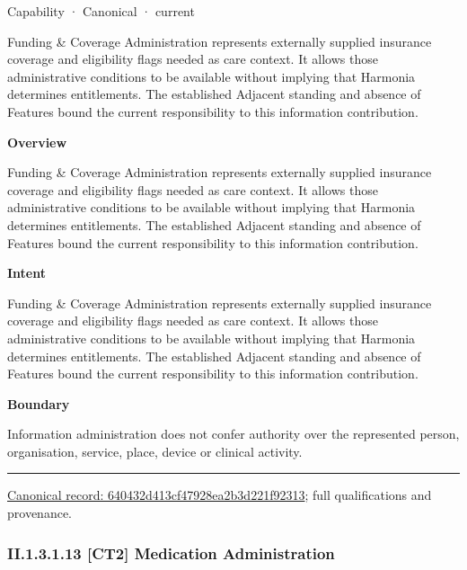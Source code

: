 \label{element:640432d413cf47928ea2b3d221f92313}
{\small Capability · Canonical · current}\par

Funding \& Coverage Administration represents externally supplied insurance coverage and eligibility flags needed as care context. It allows those administrative conditions to be available without implying that Harmonia determines entitlements. The established Adjacent standing and absence of Features bound the current responsibility to this information contribution.



\textbf{Overview}



Funding \& Coverage Administration represents externally supplied insurance coverage and eligibility flags needed as care context. It allows those administrative conditions to be available without implying that Harmonia determines entitlements. The established Adjacent standing and absence of Features bound the current responsibility to this information contribution.



\textbf{Intent}



Funding \& Coverage Administration represents externally supplied insurance coverage and eligibility flags needed as care context. It allows those administrative conditions to be available without implying that Harmonia determines entitlements. The established Adjacent standing and absence of Features bound the current responsibility to this information contribution.



\textbf{Boundary}



Information administration does not confer authority over the represented person, organisation, service, place, device or clinical activity.



\medskip\hrule\medskip

{\footnotesize \href{../../../../continuum/strategy/capability/640432d413cf47928ea2b3d221f92313.md}{Canonical record: 640432d413cf47928ea2b3d221f92313}; full qualifications and provenance.}\par
\subsubsection*{II.1.3.1.13 [CT2] Medication Administration}
\label{navigation:II.1.3.1.13}

